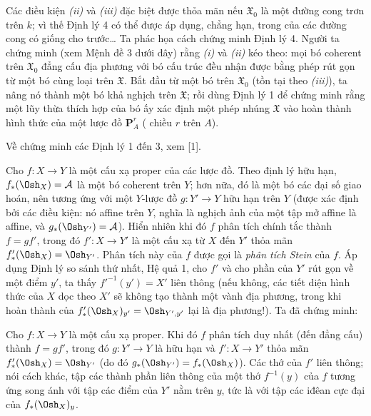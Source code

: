 Các điều kiện \textit{(ii)} và \textit{(iii)} đặc biệt được thỏa mãn nếu
$\mathfrak X_0$ là một đường cong trơn trên $k$; vì thế Định lý 4 có thể được
áp dụng, chẳng hạn, trong  của các đường cong có
giống cho trước\ldots{} Ta phác họa cách chứng minh Định lý 4. Người ta chứng
minh (xem Mệnh đề 3 dưới đây) rằng \textit{(i)} và \textit{(ii)} kéo theo:
mọi bó coherent trên $\mathfrak X_0$ đẳng cấu địa phương với bó cấu trúc đều
nhận được bằng phép rút gọn từ một bó cùng loại trên $\mathfrak X$. Bắt đầu từ
một bó  trên $\mathfrak X_0$ (tồn tại theo \textit{(iii)}), ta
nâng nó thành một bó khả nghịch trên $\mathfrak X$; rồi dùng Định lý 1 để chứng
minh rằng một lũy thừa thích hợp của bó ấy xác định một phép nhúng
$\mathfrak X$ vào hoàn thành hình thức của một lược đồ $\mathbf P_A^r$
( chiều $r$ trên $A$).

Về chứng minh các Định lý 1 đến 3, xem [1].


Cho $f:X\longrightarrow Y$ là một cấu xạ proper của các lược đồ. Theo định lý
hữu hạn, $f_*(\Osh_X)=\mathcal A$ là một bó coherent trên $Y$; hơn nữa, đó là
một bó các đại số giao hoán, nên tương ứng với một $Y$-lược đồ
$g:Y'\longrightarrow Y$ hữu hạn trên $Y$ (được xác định bởi các điều kiện: nó
affine trên $Y$, nghĩa là nghịch ảnh của một tập mở affine là affine, và
$g_*(\Osh_{Y'})=\mathcal A$). Hiển nhiên khi đó $f$ phân tích chính tắc thành
$f=gf'$, trong đó $f':X\longrightarrow Y'$ là một cấu xạ từ $X$ đến $Y'$ thỏa
mãn $f'_*(\Osh_X)=\Osh_{Y'}$. Phân tích này của $f$ được gọi là
\emph{phân tích Stein} của $f$. Áp dụng Định lý so sánh thứ nhất, Hệ quả 1,
cho $f'$ và cho phần của $Y'$ rút gọn về một điểm $y'$, ta thấy
$f'^{-1}(y')=X'$ liên thông (nếu không, các tiết diện hình thức của $X$ dọc
theo $X'$ sẽ không tạo thành một vành địa phương, trong khi hoàn thành của
$f'_*(\Osh_X)_{y'}=\Osh_{Y',y'}$ lại là địa phương!). Ta đã chứng minh:

 Cho
$f:X\longrightarrow Y$ là một cấu xạ proper. Khi đó $f$ phân tích duy nhất
(đến đẳng cấu) thành $f=gf'$, trong đó $g:Y'\longrightarrow Y$ là hữu hạn và
$f':X\longrightarrow Y'$ thỏa mãn
$f'_*(\Osh_X)=\Osh_{Y'}$ (do đó
$g_*(\Osh_{Y'})=f_*(\Osh_X)$). Các thớ của $f'$ liên thông; nói cách khác, tập
các thành phần liên thông của một thớ $f^{-1}(y)$ của $f$ tương ứng song ánh
với tập các điểm của $Y'$ nằm trên $y$, tức là với tập các iđêan cực đại của
$f_*(\Osh_X)_y$.

